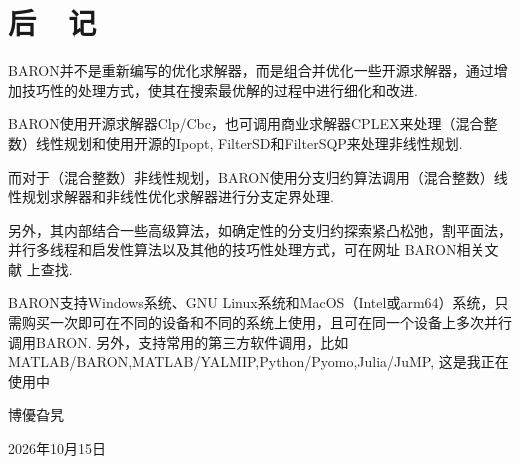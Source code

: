 

\chapter{后~~记}

BARON并不是重新编写的优化求解器，而是组合并优化一些开源求解器，通过增加技巧性的处理方式，使其在搜索最优解的过程中进行细化和改进.

BARON使用开源求解器Clp/Cbc，也可调用商业求解器CPLEX来处理（混合整数）线性规划和使用开源的Ipopt, FilterSD和FilterSQP来处理非线性规划.

而对于（混合整数）非线性规划，BARON使用分支归约算法调用（混合整数）线性规划求解器和非线性优化求解器进行分支定界处理.

另外，其内部结合一些高级算法，如确定性的分支归约探索紧凸松弛，割平面法，并行多线程和启发性算法以及其他的技巧性处理方式，可在网址 BARON相关文献 上查找.

BARON支持Windows系统、GNU Linux系统和MacOS（Intel或arm64）系统，只需购买一次即可在不同的设备和不同的系统上使用，且可在同一个设备上多次并行调用BARON. 另外，支持常用的第三方软件调用，比如MATLAB/BARON,MATLAB/YALMIP,Python/Pyomo,Julia/JuMP, 这是我正在使用中


\vspace{5ex}
\begin{flushright}
博優旮旯~~~~~~~~~

2026年10月15日~~~~~
\end{flushright}

